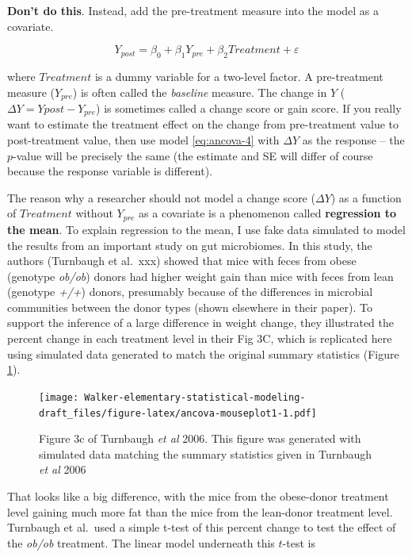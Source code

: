 \documentclass[]{book}
\begin{document}
\textbf{Don't do this}. Instead, add the pre-treatment measure into the model as a covariate.

\begin{equation}
Y_{post} = \beta_0 + \beta_1 Y_{pre} + \beta_2 Treatment + \varepsilon
\label{eq:ancova-4}
\end{equation}

where \(Treatment\) is a dummy variable for a two-level factor. A pre-treatment measure (\(Y_{pre}\)) is often called the \emph{baseline} measure. The change in \(Y\) (\(\Delta Y = Y{post} - Y_{pre}\)) is sometimes called a change score or gain score. If you really want to estimate the treatment effect on the change from pre-treatment value to post-treatment value, then use model \eqref{eq:ancova-4} with \(\Delta Y\) as the response -- the \(p\)-value will be precisely the same (the estimate and SE will differ of course because the response variable is different).

The reason why a researcher should not model a change score (\(\Delta Y\)) as a function of \(Treatment\) without \(Y_{pre}\) as a covariate is a phenomenon called \textbf{regression to the mean}. To explain regression to the mean, I use fake data simulated to model the results from an important study on gut microbiomes. In this study, the authors (Turnbaugh et al.~xxx) showed that mice with feces from obese (genotype \emph{ob/ob}) donors had higher weight gain than mice with feces from lean (genotype \emph{+/+}) donors, presumably because of the differences in microbial communities between the donor types (shown elsewhere in their paper). To support the inference of a large difference in weight change, they illustrated the percent change in each treatment level in their Fig 3C, which is replicated here using simulated data generated to match the original summary statistics (Figure \ref{fig:ancova-mouseplot1}).

\begin{figure}
\centering
\texttt{[image: Walker-elementary-statistical-modeling-draft\_files/figure-latex/ancova-mouseplot1-1.pdf]}
\caption{\label{fig:ancova-mouseplot1}Figure 3c of Turnbaugh \emph{et al} 2006. This figure was generated with simulated data matching the summary statistics given in Turnbaugh \emph{et al} 2006}
\end{figure}

That looks like a big difference, with the mice from the obese-donor treatment level gaining much more fat than the mice from the lean-donor treatment level. Turnbaugh et al.~used a simple t-test of this percent change to test the effect of the \emph{ob/ob} treatment. The linear model underneath this \(t\)-test is
\end{document}
